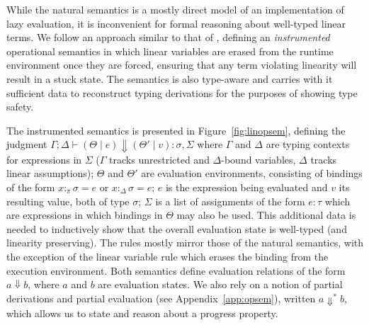 \documentclass[acmsmall,review,anonymous,screen]{acmart}
\begin{document}

While the natural semantics is a mostly direct model of an implementation
of lazy evaluation, it is inconvenient for formal reasoning about
well-typed linear terms.
%
We follow an approach
similar to that of \cite{cite:linearhaskell}, defining
an \emph{instrumented} operational semantics in which linear variables are
erased from 
the runtime environment once they are forced, ensuring that any term violating linearity
will result in a stuck state. The semantics is also type-aware and
carries with it sufficient data to reconstruct typing derivations for
the purposes of showing type safety.

The instrumented semantics is presented in
Figure~\ref{fig:linopsem}, defining the judgment $\Gamma ; \Delta \vdash (\Theta \mid e) \Downarrow (\Theta'
\mid v) : \sigma , \Sigma$ where $\Gamma$ and $\Delta$ are typing
contexts for expressions in $\Sigma$
($\Gamma$ tracks unrestricted and $\Delta$-bound variables, $\Delta$ tracks linear
assumptions);
$\Theta$ and $\Theta'$ are evaluation environments, consisting of bindings of the form
$x :_\pi \sigma = e$ or $x :_\Delta \sigma = e$; $e$ is the expression being evaluated and $v$
its resulting value, both of type $\sigma$; $\Sigma$ is a list of assignments of the form
$e : \tau$ which are expressions in which
bindings in $\Theta$ may also be used. This additional data is needed to
inductively show that the overall evaluation state is well-typed (and
linearity preserving). The rules mostly mirror those of the natural
semantics, with the exception of the linear variable rule which erases
the binding from the execution environment. Both semantics define
evaluation relations of the form $a \Downarrow b$, where $a$ and $b$
are evaluation states. We also rely on a notion
of partial derivations and partial evaluation (see
Appendix~\ref{app:opsem}), written $a\Downarrow^* b$, which allows us
to state and reason about a progress property.
\end{document}
